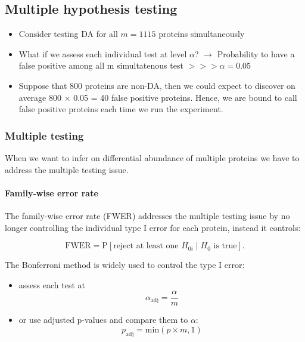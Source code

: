 \documentclass[
]{article}
\providecommand{\tightlist}{%
  \setlength{\itemsep}{0pt}\setlength{\parskip}{0pt}}
\begin{document}
\hypertarget{multiple-hypothesis-testing}{%
\subsection{Multiple hypothesis
testing}\label{multiple-hypothesis-testing}}

\begin{itemize}
\item
  Consider testing DA for all \(m=1115\) proteins simultaneously
\item
  What if we assess each individual test at level \(\alpha\)?
  \(\rightarrow\) Probability to have a false positive among all m
  simultatenous test \(>>> \alpha= 0.05\)
\item
  Suppose that 800 proteins are non-DA, then we could expect to discover
  on average 800 × 0.05 = 40 false positive proteins. Hence, we are
  bound to call false positive proteins each time we run the experiment.
\end{itemize}

\hypertarget{multiple-testing}{%
\subsubsection{Multiple testing}\label{multiple-testing}}

When we want to infer on differential abundance of multiple proteins we
have to address the multiple testing issue.

\hypertarget{family-wise-error-rate}{%
\paragraph{Family-wise error rate}\label{family-wise-error-rate}}

The family-wise error rate (FWER) addresses the multiple testing issue
by no longer controlling the individual type I error for each protein,
instead it controls:

\[
   \text{FWER}=\text{P}\left[\text{reject at least one }H_{0i} \mid H_0\text{ is true}\right].
\]

The Bonferroni method is widely used to control the type I error:

\begin{itemize}
\tightlist
\item
  assess each test at \[\alpha_\text{adj}=\frac{\alpha}{m}\]
\item
  or use adjusted p-values and compare them to \(\alpha\):
  \[p_\text{adj}=\text{min}\left(p \times m,1\right)\]
\end{itemize}
\end{document}
